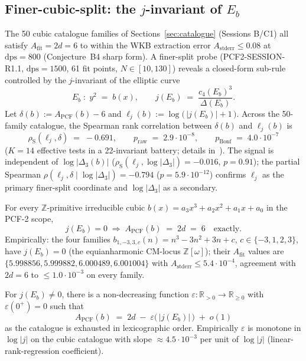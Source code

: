 
\subsection{Finer-cubic-split: the $j$-invariant of $E_b$}
\label{sec:finer-split-j}

The 50 cubic catalogue families of Sections~\ref{sec:catalogue}
(Sessions B/C1) all satisfy $A_{\mathrm{fit}} = 2d = 6$ to within
the WKB extraction error $A_{\mathrm{stderr}} \le 0.08$ at
$\mathrm{dps} = 800$ (Conjecture~B4 sharp form). A finer-split
probe (PCF2-SESSION-R1.1, $\mathrm{dps} = 1500$, 61 fit points,
$N \in [10, 130]$) reveals a closed-form sub-rule controlled by the
$j$-invariant of the elliptic curve
\[
   E_b \;:\; y^2 \;=\; b(x), \qquad
   j(E_b) \;=\; \frac{c_4(E_b)^3}{\Delta(E_b)}.
\]
Let $\delta(b) := A_{\mathrm{PCF}}(b) - 6$ and
$\ell_j(b) := \log\bigl(\,|j(E_b)| + 1\,\bigr)$.
Across the 50-family catalogue, the Spearman rank correlation between
$\delta(b)$ and $\ell_j(b)$ is
\[
   \rho_{\mathrm{S}}(\ell_j, \delta) \;=\; -0.691,
   \qquad p_{\mathrm{raw}} \;=\; 2.9 \cdot 10^{-8},
   \qquad p_{\mathrm{Bonf}} \;=\; 4.0 \cdot 10^{-7}
\]
($K = 14$ effective tests in a 22-invariant battery; details
in~\cite{R11}). The signal is independent of $\log|\Delta_3(b)|$
($\rho_{\mathrm{S}}(\ell_j, \log|\Delta_3|) = -0.016$, $p = 0.91$);
the partial Spearman $\rho(\ell_j, \delta \mid \log|\Delta_3|) = -0.794$
($p = 5.9 \cdot 10^{-12}$) confirms $\ell_j$ as the primary
finer-split coordinate and $\log|\Delta_3|$ as a secondary.

\begin{conjecture}
\label{conj:b5}
For every $\mathbb{Z}$-primitive irreducible cubic
$b(x) = a_3 x^3 + a_2 x^2 + a_1 x + a_0$ in the PCF-2 scope,
\[
   j(E_b) = 0 \;\Longrightarrow\; A_{\mathrm{PCF}}(b) \;=\; 2d \;=\; 6
   \quad \text{exactly}.
\]
Empirically: the four families $b_{1,-3,3,c}(n) = n^3 - 3n^2 + 3n + c$,
$c \in \{-3, 1, 2, 3\}$, have $j(E_b) = 0$ (the equianharmonic CM-locus
$\mathbb{Z}[\omega]$); their $A_{\mathrm{fit}}$ values are
$\{5.998856, 5.999882, 6.000489, 6.001004\}$ with
$A_{\mathrm{stderr}} \le 5.4 \cdot 10^{-4}$, agreement with $2d = 6$
to $\le 1.0 \cdot 10^{-3}$ on every family.
\end{conjecture}

\begin{conjecture}
\label{conj:b6}
For $j(E_b) \neq 0$, there is a non-decreasing function
$\varepsilon : \mathbb{R}_{> 0} \to \mathbb{R}_{\ge 0}$ with
$\varepsilon(0^+) = 0$ such that
\[
   A_{\mathrm{PCF}}(b) \;=\; 2d \;-\; \varepsilon\bigl(\,|j(E_b)|\,\bigr)
   \;+\; o(1)
\]
as the catalogue is exhausted in lexicographic order. Empirically
$\varepsilon$ is monotone in $\log|j|$ on the cubic catalogue with
slope $\approx 4.5 \cdot 10^{-3}$ per unit of $\log|j|$
(linear-rank-regression coefficient).
\end{conjecture}


